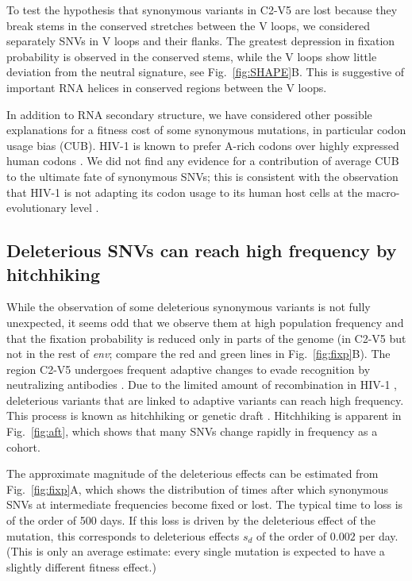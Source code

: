 \documentclass[11pt]{article}
\newcommand{\FIG}[1]{Fig.~\ref{fig:#1}}
\newcommand{\env}{\textit{env}}
\newcommand{\shankaregion}{C2-V5}
\begin{document}
To test the hypothesis that synonymous variants in \shankaregion{} are lost because they
break stems in the conserved stretches between the V loops, we considered
separately SNVs in V loops and their flanks. The greatest
depression in fixation probability is observed in the conserved stems, while the
V loops show little deviation from the neutral signature, see
\FIG{SHAPE}B. This is suggestive of important RNA helices in conserved
regions between the V loops.

In addition to RNA secondary structure, we have considered other possible
explanations for a fitness cost of some synonymous mutations, in particular
codon usage bias (CUB). HIV-1 is known to prefer A-rich codons over highly
expressed human codons \citep{jenkins_extent_2003, kuyl_biased_2012}. We
did not find any evidence for a contribution of average CUB to the ultimate
fate of synonymous SNVs; this is consistent with the observation that HIV-1 is not
adapting its codon usage to its human host cells at the macro-evolutionary level
\citep{kuyl_biased_2012}.


\subsection*{Deleterious SNVs can reach high frequency by hitchhiking}
While the observation of some deleterious synonymous variants is not fully
unexpected, it seems odd that we observe them at high population
frequency and that the fixation probability is reduced only in parts of the
genome (in \shankaregion{} but not in the rest of \env{}; compare the red
and green lines in \FIG{fixp}B).
The region \shankaregion{} undergoes frequent adaptive changes to evade
recognition by neutralizing antibodies \cite{williamson_adaptation_2003,wei_antibody_2003,
richman_rapid_2003}. Due to the limited amount of recombination in HIV-1
\cite{neher_recombination_2010, batorsky_estimate_2011}, deleterious variants
that are linked to adaptive variants can reach high frequency. This process is
known as hitchhiking \citep{smith_hitch-hiking_1974} or genetic draft
\citep{gillespie_genetic_2000,neher_genetic_2011}. Hitchhiking is apparent in
\FIG{aft}, which shows that many SNVs change rapidly in frequency as a
cohort. 

The approximate magnitude of the deleterious effects can be estimated from
\FIG{fixp}A, which shows the distribution of times after which synonymous
SNVs at intermediate frequencies become fixed or lost. The typical time to
loss is of the order of 500 days. If this loss is driven by the deleterious
effect of the mutation, this corresponds to deleterious effects $s_d$ of the
order of $0.002$ per day. (This is only an average estimate: every single
mutation is expected to have a slightly different fitness effect.)
\end{document}
